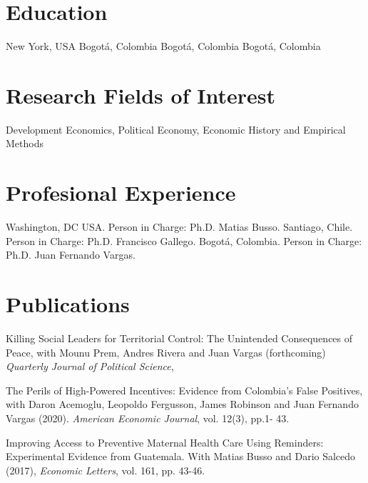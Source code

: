 \documentclass{moderncv}
\begin{document}
\maketitle
\section{\textbf{Education}}
 {New York, USA}{}{}
 {Bogot\'a, Colombia}{}{}
 {Bogot\'a, Colombia}{}{}
 {Bogot\'a, Colombia}{}{}

\section{\textbf{Research Fields of Interest}}
{Development Economics,  Political Economy,  Economic History and Empirical Methods }

\section{\textbf{Profesional Experience}}
 {}{}{Washington, DC USA. Person in Charge: Ph.D. Matias Busso.}
 {}{}{Santiago, Chile. Person in Charge: Ph.D. Francisco Gallego.}
 {}{}{Bogot\'a, Colombia. Person in Charge: Ph.D. Juan Fernando Vargas.}

\section{\textbf{Publications}}
{Killing Social Leaders for Territorial Control: The Unintended Consequences of Peace, with Mounu Prem, Andres Rivera and Juan Vargas (forthcoming) \emph{Quarterly Journal of Political Science},\\}

{The Perils of High-Powered Incentives: Evidence from Colombia's False Positives, with Daron Acemoglu, Leopoldo Fergusson, James Robinson and Juan Fernando Vargas (2020). \emph{American Economic Journal}, vol. 12(3), pp.1- 43. \\ }  


{Improving Access to Preventive Maternal Health Care Using Reminders: Experimental Evidence from Guatemala. With Matias Busso and Dario Salcedo (2017), \emph{Economic Letters}, vol. 161, pp. 43-46.\\} 
\end{document}
